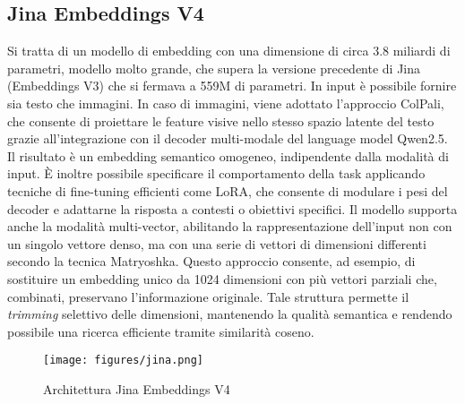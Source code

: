 \subsection{Jina Embeddings V4}
Si tratta di un modello di embedding con una dimensione di circa 3.8 miliardi di parametri, modello molto grande, che supera la versione precedente di Jina (Embeddings V3) che si fermava a 559M di parametri. 
In input è possibile fornire sia testo che immagini. In caso di immagini, viene adottato l’approccio ColPali, che consente di proiettare le feature visive nello stesso spazio latente del testo grazie all’integrazione con il decoder multi-modale del language model Qwen2.5. Il risultato è un embedding semantico omogeneo, indipendente dalla modalità di input.
È inoltre possibile specificare il comportamento della task applicando tecniche di fine-tuning efficienti come LoRA, che consente di modulare i pesi del decoder e adattarne la risposta a contesti o obiettivi specifici.
Il modello supporta anche la modalità multi-vector, abilitando la rappresentazione dell’input non con un singolo vettore denso, ma con una serie di vettori di dimensioni differenti secondo la tecnica Matryoshka. Questo approccio consente, ad esempio, di sostituire un embedding unico da 1024 dimensioni con più vettori parziali che, combinati, preservano l’informazione originale. Tale struttura permette il \textit{trimming} selettivo delle dimensioni, mantenendo la qualità semantica e rendendo possibile una ricerca efficiente tramite similarità coseno.

\begin{figure}[!ht]
\centering
\texttt{[image: figures/jina.png]}
\caption{Architettura Jina Embeddings V4}
\end{figure}

